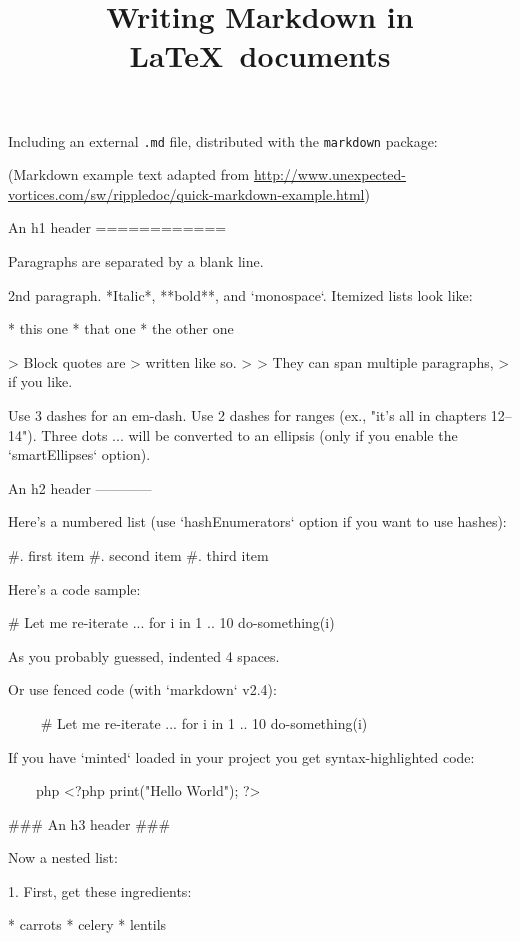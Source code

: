\documentclass{article}
\title{Writing Markdown in \LaTeX\ documents}
\author{}
\date{}
\begin{document}
\maketitle

Including an external \texttt{.md} file, distributed with the \texttt{markdown} package:



(Markdown example text adapted from \url{http://www.unexpected-vortices.com/sw/rippledoc/quick-markdown-example.html})

\begin{markdown}
An h1 header
============
\label{first:section}

Paragraphs are separated by a blank line. 

2nd paragraph. *Italic*, **bold**, and `monospace`. Itemized lists
look like:

* this one
* that one
* the other one

> Block quotes are
> written like so.
>
> They can span multiple paragraphs,
> if you like.

Use 3 dashes for an em-dash. Use 2 dashes for ranges (ex., "it's all
in chapters 12--14"). Three dots ... will be converted to an ellipsis (only if you enable the `smartEllipses` option).



An h2 header
------------

Here's a numbered list (use `hashEnumerators` option if you want to use hashes):

#. first item
#. second item
#. third item

Here's a code sample:

    # Let me re-iterate ...
    for i in 1 .. 10 { do-something(i) }

As you probably guessed, indented 4 spaces. 

Or use fenced code (with `markdown` v2.4):

~~~~
# Let me re-iterate ...
for i in 1 .. 10 { do-something(i) }
~~~~

If you have `minted` loaded in your project you get syntax-highlighted code:

~~~~php
<?php
    print("Hello World");
?>
~~~~

### An h3 header ###

Now a nested list:

 1. First, get these ingredients:

      * carrots
      * celery
      * lentils


\end{markdown}
\end{document}
